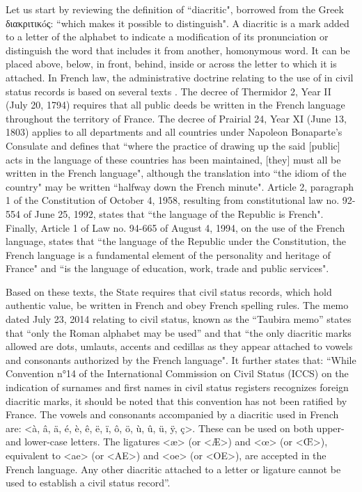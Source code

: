 \documentclass[output=paper,colorlinks,citecolor=brown]{langscibook}
\begin{document}
Let us start by reviewing the definition of ``diacritic", borrowed from the Greek διακριτικóς: ``which makes it possible to distinguish". A diacritic is a mark added to a letter of the alphabet to indicate a modification of its pronunciation or distinguish the word that includes it from another, homonymous word. It can be placed above, below, in front, behind, inside or across the letter to which it is attached. In French law, the administrative doctrine relating to the use of  in civil status records is based on several texts \citep{sm:DeBailliencourt2018}. The decree of Thermidor 2, Year II (July 20, 1794) requires that all public deeds be written in the French language throughout the territory of France. The decree of Prairial 24, Year XI (June 13, 1803) applies to all departments and all countries under Napoleon Bonaparte's Consulate and defines that ``where the practice of drawing up the said [public] acts in the language of these countries has been maintained, [they] must all be written in the French language", although the translation into ``the idiom of the country" may be written ``halfway down the French minute". Article 2, paragraph 1 of the Constitution of October 4, 1958, resulting from constitutional law no. 92-554 of June 25, 1992, states that “the language of the Republic is French". Finally, Article 1 of Law no. 94-665 of August 4, 1994, on the use of the French language, states that ``the language of the Republic under the Constitution, the French language is a fundamental element of the personality and heritage of France" and ``is the language of education, work, trade and public services".

Based on these texts, the State requires that civil status records, which hold authentic value, be written in French and obey French spelling rules. The memo dated July 23, 2014 \citep{sm:BOMJ2014} relating to civil status, known as the “Tau\-bira memo” states that “only the Roman alphabet may be used” and that “the only diacritic marks allowed are dots, umlauts, accents and cedillas as they appear attached to vowels and consonants authorized by the French language". It further states that: ``While Convention n°14 of the International Commission on Civil Status (ICCS) on the indication of surnames and first names in civil status registers recognizes foreign diacritic marks, it should be noted that this convention has not been ratified by France. The vowels and consonants accompanied by a diacritic used in French are: <à, â, ä, é, è, ê, ë, ï, ô, ö, ù, û, ü, ÿ, ç>. These  can be used on both upper- and lower-case letters. The ligatures <æ> (or <Æ>) and <œ> (or <Œ>), equivalent to <ae> (or <AE>) and <oe> (or <OE>), are accepted in the French language. Any other diacritic attached to a letter or ligature cannot be used to establish a civil status record”. 
\end{document}
